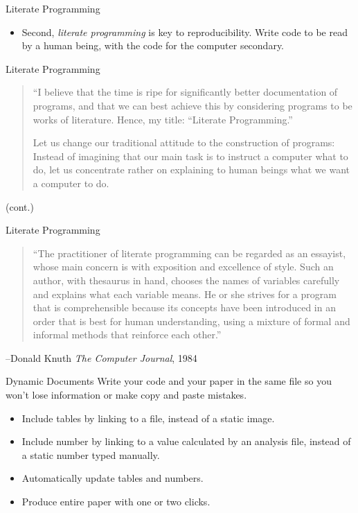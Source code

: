 \documentclass{beamer}
\begin{document}
\begin{frame}{Literate Programming}
\begin{itemize}
\item
Second, \textit{literate programming} is key to reproducibility. Write code to be read by a human being, with the code for the computer secondary.
\end{itemize}
\end{frame}

\begin{frame}{Literate Programming}
\begin{quote}
``I believe that the time is ripe for significantly better documentation of programs, and that we can best achieve this by considering programs to be works of literature. Hence, my title: ``Literate Programming.''

Let us change our traditional attitude to the construction of programs: Instead of imagining that our main task is to instruct a computer what to do, let us concentrate rather on explaining to human beings what we want a computer to do.
\end{quote}
(cont.)
\end{frame}

\begin{frame}{Literate Programming}
\begin{quote}
``The practitioner of literate programming can be regarded as an essayist, whose main concern is with exposition and excellence of style. Such an author, with thesaurus in hand, chooses the names of variables carefully and explains what each variable means. He or she strives for a program that is comprehensible because its concepts have been introduced in an order that is best for human understanding, using a mixture of formal and informal methods that reinforce each other.''
\end{quote}
--Donald Knuth \textit{The Computer Journal}, 1984
\href{http://www.literateprogramming.com/index.html}{}
\href{http://comjnl.oxfordjournals.org/content/27/2/97.full.pdf+html}{}
\end{frame}




\begin{frame}{Dynamic Documents}
Write your code and your paper in the same file so you won't lose information or make copy and paste mistakes.

\begin{itemize}
\item Include tables by linking to a file, instead of a static image.
\item Include number by linking to a value calculated by an analysis file, instead of a static number typed manually.
\item Automatically update tables and numbers.
\item Produce entire paper with one or two clicks.
\end{itemize} 
\end{frame}
\end{document}
